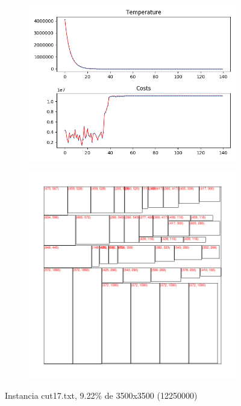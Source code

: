 \begin{figure}
\centering
\begin{subfigure}{.5\textwidth}
  \centering
  \includegraphics[width=1\linewidth]{results/cut17/2/plot}
  \label{fig:sub1}
\end{subfigure}%
\begin{subfigure}{.5\textwidth}
  \centering
  \includegraphics[width=1\linewidth]{results/cut17/2/cut}
  \label{fig:sub2}
\end{subfigure}
\caption{Instancia cut17.txt, 9.22\% de 3500x3500 (12250000)}
\label{fig:test}
\end{figure}


